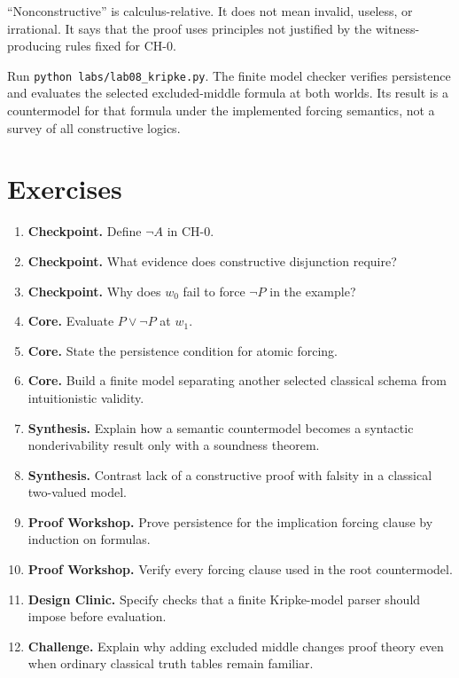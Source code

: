 

\begin{warningbox}
“Nonconstructive” is calculus-relative. It does not mean invalid, useless, or irrational. It says that the proof uses principles not justified by the witness-producing rules fixed for $\mathrm{CH}\text{-}0$.
\end{warningbox}

\begin{labbox}
Run \texttt{python labs/lab08_kripke.py}. The finite model checker verifies persistence and evaluates the selected excluded-middle formula at both worlds. Its result is a countermodel for that formula under the implemented forcing semantics, not a survey of all constructive logics.
\end{labbox}

\section*{Exercises}
\begin{enumerate}[label=\textbf{8.\arabic*.}]
\item \textbf{Checkpoint.} Define $\neg A$ in $\mathrm{CH}\text{-}0$.
\item \textbf{Checkpoint.} What evidence does constructive disjunction require?
\item \textbf{Checkpoint.} Why does $w_0$ fail to force $\neg P$ in the example?
\item \textbf{Core.} Evaluate $P\lor\neg P$ at $w_1$.
\item \textbf{Core.} State the persistence condition for atomic forcing.
\item \textbf{Core.} Build a finite model separating another selected classical schema from intuitionistic validity.
\item \textbf{Synthesis.} Explain how a semantic countermodel becomes a syntactic nonderivability result only with a soundness theorem.
\item \textbf{Synthesis.} Contrast lack of a constructive proof with falsity in a classical two-valued model.
\item \textbf{Proof Workshop.} Prove persistence for the implication forcing clause by induction on formulas.
\item \textbf{Proof Workshop.} Verify every forcing clause used in the root countermodel.
\item \textbf{Design Clinic.} Specify checks that a finite Kripke-model parser should impose before evaluation.
\item \textbf{Challenge.} Explain why adding excluded middle changes proof theory even when ordinary classical truth tables remain familiar.
\end{enumerate}
